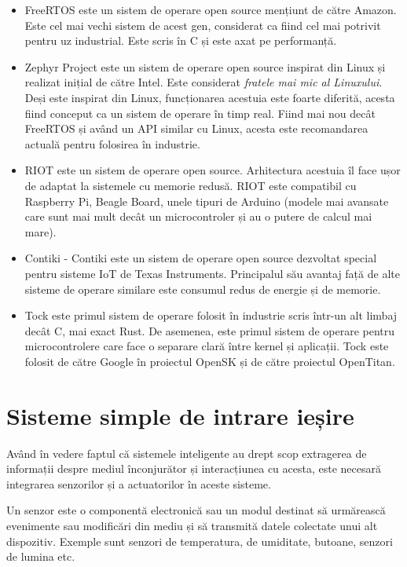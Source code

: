 \begin{itemize}
  \item FreeRTOS este un sistem de operare open source mențiunt de către Amazon.
    Este cel mai vechi sistem de acest gen, considerat ca fiind cel mai potrivit pentru uz industrial.
    Este scris în C și este axat pe performanță.
  \item Zephyr Project este un sistem de operare open source inspirat din Linux și realizat inițial de către Intel.
    Este considerat \textit{fratele mai mic al Linuxului}.
    Deși este inspirat din Linux, funcționarea acestuia este foarte diferită, acesta fiind conceput ca un sistem de operare în timp real.
    Fiind mai nou decât FreeRTOS și având un API similar cu Linux, acesta este recomandarea actuală pentru folosirea în industrie.
  \item RIOT este un sistem de operare open source.
    Arhitectura acestuia îl face ușor de adaptat la sistemele cu memorie redusă.
    RIOT este compatibil cu Raspberry Pi, Beagle Board, unele tipuri de Arduino (modele mai avansate care sunt mai mult decât un microcontroler și au o putere de calcul mai mare).
  \item Contiki - Contiki este un sistem de operare open source dezvoltat special pentru sisteme IoT de Texas Instruments.
    Principalul său avantaj față de alte sisteme de operare similare este consumul redus de energie și de memorie.
  \item Tock este primul sistem de operare folosit în industrie scris într-un alt limbaj decât C, mai exact Rust.
    De asemenea, este primul sistem de operare pentru microcontrolere care face o separare clară între kernel și aplicații.
    Tock este folosit de către Google în proiectul OpenSK și de către proiectul OpenTitan.
\end{itemize}

\section{Sisteme simple de intrare ieșire}
\label{sec:embed:io}

Având în vedere faptul că sistemele inteligente au drept scop extragerea de informații despre mediul înconjurător și interacțiunea cu acesta, este necesară integrarea senzorilor și a actuatorilor în aceste sisteme.

Un senzor este o componentă electronică sau un modul destinat să urmărească evenimente sau modificări din mediu și să transmită datele colectate unui alt dispozitiv.
Exemple sunt senzori de temperatura, de umiditate, butoane, senzori de lumina etc.

